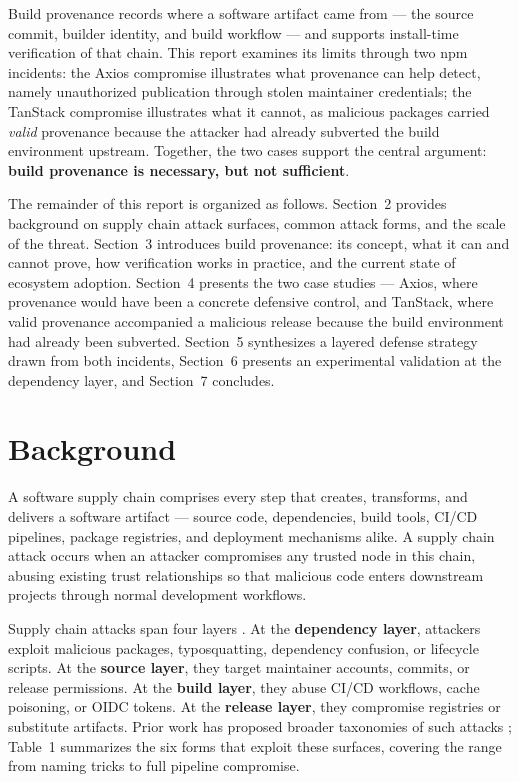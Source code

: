 \documentclass[12pt,a4paper]{article}
\begin{document}
Build provenance records where a software artifact came from --- the source commit, builder identity, and build workflow --- and supports install-time verification of that chain. This report examines its limits through two npm incidents: the Axios compromise \cite{axios-postmortem,microsoft-axios,openai-axios} illustrates what provenance can help detect, namely unauthorized publication through stolen maintainer credentials; the TanStack compromise \cite{tanstack-postmortem,tanstack-followup} illustrates what it cannot, as malicious packages carried \textit{valid} provenance because the attacker had already subverted the build environment upstream. Together, the two cases support the central argument: \textbf{build provenance is necessary, but not sufficient}.

The remainder of this report is organized as follows. Section~2 provides background on supply chain attack surfaces, common attack forms, and the scale of the threat. Section~3 introduces build provenance: its concept, what it can and cannot prove, how verification works in practice, and the current state of ecosystem adoption. Section~4 presents the two case studies --- Axios, where provenance would have been a concrete defensive control, and TanStack, where valid provenance accompanied a malicious release because the build environment had already been subverted. Section~5 synthesizes a layered defense strategy drawn from both incidents, Section~6 presents an experimental validation at the dependency layer, and Section~7 concludes.

\section{Background}

A software supply chain comprises every step that creates, transforms, and delivers a software artifact --- source code, dependencies, build tools, CI/CD pipelines, package registries, and deployment mechanisms alike. A supply chain attack occurs when an attacker compromises any trusted node in this chain, abusing existing trust relationships so that malicious code enters downstream projects through normal development workflows.

Supply chain attacks span four layers \cite{slsa-threats}. At the \textbf{dependency layer}, attackers exploit malicious packages, typosquatting, dependency confusion, or lifecycle scripts. At the \textbf{source layer}, they target maintainer accounts, commits, or release permissions. At the \textbf{build layer}, they abuse CI/CD workflows, cache poisoning, or OIDC tokens. At the \textbf{release layer}, they compromise registries or substitute artifacts. Prior work has proposed broader taxonomies of such attacks \cite{ssc-taxonomy}; Table~1 summarizes the six forms that exploit these surfaces, covering the range from naming tricks to full pipeline compromise.
\end{document}
